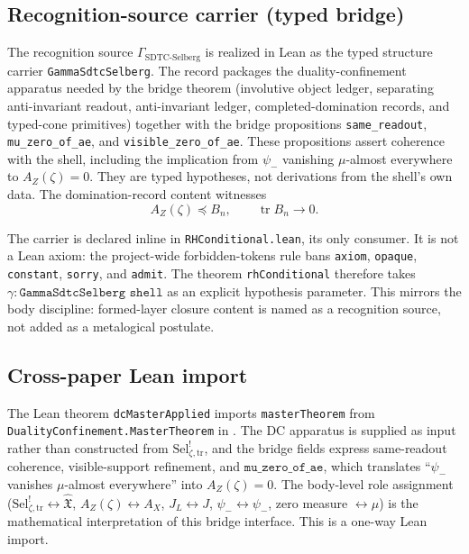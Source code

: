 \documentclass[11pt]{article}
\DeclareMathOperator{\trace}{tr}
\newcommand{\JL}{J_{L}}
\newcommand{\psimRH}{\psi_{-}}
\newcommand{\AZ}{A_{Z}(\zeta)}
\newcommand{\Sel}{\mathrm{Sel}^{!}_{\zeta,\mathrm{tr}}}
\newcommand{\GamSDTCSelberg}{\Gamma_{\mathrm{SDTC\text{-}Selberg}}}
\newcommand{\psim}{\psi_{-}}
\newcommand{\AX}{A_{X}}
\newcommand{\IOL}{\hat{\mathfrak{X}}}
\theoremstyle{definition}
\begin{document}
\subsection*{Recognition-source carrier (typed bridge)}

The recognition source \(\GamSDTCSelberg\) is realized in Lean as the
typed structure carrier \nolinkurl{GammaSdtcSelberg}.  The record packages
the duality-confinement apparatus needed by the bridge theorem
(involutive object ledger, separating anti-invariant readout,
anti-invariant ledger, completed-domination records, and typed-cone
primitives) together with the bridge propositions
\nolinkurl{same_readout}, \nolinkurl{mu_zero_of_ae}, and
\nolinkurl{visible_zero_of_ae}.  These propositions assert coherence
with the shell, including the implication from \(\psim\) vanishing
\(\mu\)-almost everywhere to \(\AZ=0\).  They are typed hypotheses, not
derivations from the shell's own data.  The domination-record content
witnesses
\[
  \AZ \preceq B_n,
  \qquad
  \trace B_n \to 0 .
\]

The carrier is declared inline in \texttt{RHConditional.lean}, its only
consumer.  It is not a Lean axiom: the project-wide forbidden-tokens
rule bans \texttt{axiom}, \texttt{opaque}, \texttt{constant},
\texttt{sorry}, and \texttt{admit}.  The theorem
\texttt{rhConditional} therefore takes
\(\gamma : \texttt{GammaSdtcSelberg shell}\) as an explicit hypothesis
parameter.  This mirrors the body discipline: formed-layer closure
content is named as a recognition source, not added as a metalogical
postulate.

\subsection*{Cross-paper Lean import}

The Lean theorem \texttt{dcMasterApplied} imports
\texttt{masterTheorem} from
\nolinkurl{DualityConfinement.MasterTheorem} in
\cite{TsiokosSDTC2026}.  The DC apparatus is supplied as input rather
than constructed from \(\Sel\), and the bridge fields express
same-readout coherence, visible-support refinement, and
\(\mathtt{mu\_zero\_of\_ae}\), which translates ``\(\psim\) vanishes
\(\mu\)-almost everywhere'' into \(\AZ=0\).  The body-level role
assignment (\(\Sel\leftrightarrow\IOL\), \(\AZ\leftrightarrow\AX\),
\(\JL\leftrightarrow J\), \(\psimRH\leftrightarrow\psim\), zero measure
\(\leftrightarrow\mu\)) is the mathematical interpretation of this
bridge interface.  This is a one-way Lean import.
\end{document}
